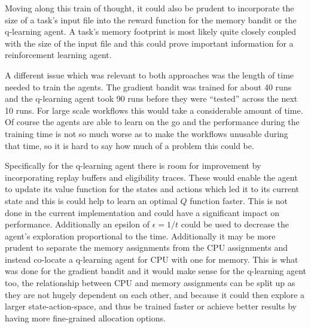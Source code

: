Moving along this train of thought, it could also be prudent to incorporate the size of a task’s input file into the reward function for the memory bandit or the q-learning agent. A task’s memory footprint is most likely quite closely coupled with the size of the input file and this could prove important information for a reinforcement learning agent.

A different issue which was relevant to both approaches was the length of time needed to train the agents. The gradient bandit was trained for about 40 runs and the q-learning agent took 90 runs before they were “tested” across the next 10 runs. For large scale workflows this would take a considerable amount of time. Of course the agents are able to learn on the go and the performance during the training time is not so much worse as to make the workflows unusable during that time, so it is hard to say how much of a problem this could be.

Specifically for the q-learning agent there is room for improvement by incorporating replay buffers and eligibility traces. These would enable the agent to update its value function for the states and actions which led it to its current state and this is could help to learn an optimal $Q$ function faster. This is not done in the current implementation and could have a significant impact on performance. Additionally an epsilon of $\epsilon = 1/t$ could be used to decrease the agent’s exploration proportional to the time. Additionally it may be more prudent to separate the memory assignments from the CPU assignments and instead co-locate a q-learning agent for CPU with one for memory. This is what was done for the gradient bandit and it would make sense for the q-learning agent too, the relationship between CPU and memory assignments can be split up as they are not hugely dependent on each other, and because it could then explore a larger state-action-space, and thus be trained faster or achieve better results by having more fine-grained allocation options.

